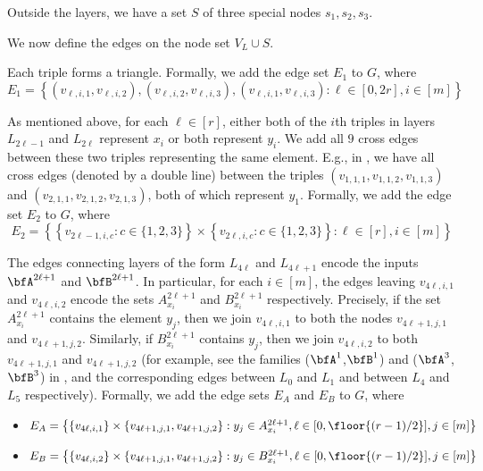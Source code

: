  
  Outside the layers, we have a set $S$ of three special nodes $s_1, s_2, s_3$. 

\smallskip
We now define the edges on the node set $V_L\cup S$.

  Each triple forms a triangle. Formally, we add the edge set $E_1$ to $G$, where 
$$E_1=\left\{(v_{\ell, i,1}, v_{\ell, i,2}), (v_{\ell, i,2}, v_{\ell, i,3}), (v_{\ell, i,1}, v_{\ell, i,3}): \ell\in [0,2r], i\in [m] \right\}$$


 As mentioned above, for each $\ell\in [r]$, either both of the $i$th triples in layers $L_{2\ell-1}$ and $L_{2\ell}$ represent $x_i$ or both represent $y_i$. We add all $9$ cross edges between these two triples representing the same element. E.g., in , we have all cross edges (denoted by a double line) between the triples $(v_{1,1,1}, v_{1,1,2}, v_{1,1,3})$ and $(v_{2,1,1}, v_{2,1,2}, v_{2,1,3})$, both of which represent $y_1$. Formally, we add the edge set $E_2$ to $G$, where 
$$E_2=\left\{\left\{v_{2\ell-1, i, c}: c\in \{1,2,3\}\right\}\times \left\{v_{2\ell, i, c}: c\in \{1,2,3\}\right\}: \ell\in [r], i\in [m] \right\}$$

 The edges connecting layers of the form $L_{4\ell}$ and $L_{4\ell+1}$ encode the inputs $\bfA^{2\ell+1}$ and $\bfB^{2\ell+1}$. In particular, for each $i\in [m]$, the edges leaving $v_{4\ell, i, 1}$ and $v_{4\ell, i, 2}$ encode the sets $A_{x_i}^{2\ell+1}$ and $B_{x_i}^{2\ell+1}$ respectively. Precisely, if the set $A_{x_i}^{2\ell+1}$ contains the element $y_j$, then we join $v_{4\ell, i, 1}$ to both the nodes $v_{4\ell+1, j, 1}$and $v_{4\ell+1, j, 2}$. Similarly, if $B_{x_i}^{2\ell+1}$ contains $y_j$, then we join $v_{4\ell, i, 2}$ to both $v_{4\ell+1, j, 1}$ and  $v_{4\ell+1, j, 2}$ (for example, see the families ($\bfA^1$,$\bfB^1$) and ($\bfA^3$,$\bfB^3$) in , and the corresponding edges between $L_0$ and $L_1$ and between $L_4$ and $L_5$ respectively). Formally, we add the edge sets $E_A$ and $E_B$ to $G$, where 


\begin{itemize}
\item $E_A= \left\{\left\{v_{4\ell, i, 1}\right\}\times \left\{v_{4\ell+1,j,1}, v_{4\ell+1, j, 2}\right\}: y_j\in A_{x_i}^{2\ell+1}, \ell\in [0,\floor{(r-1)/2}], j\in [m]\right\}$

\item $E_B= \left\{\left\{v_{4\ell, i, 2}\right\}\times \left\{v_{4\ell+1,j,1}, v_{4\ell+1, j, 2}\right\}: y_j\in B_{x_i}^{2\ell+1}, \ell\in [0,\floor{(r-1)/2}], j\in [m]\right\}$
\end{itemize}

